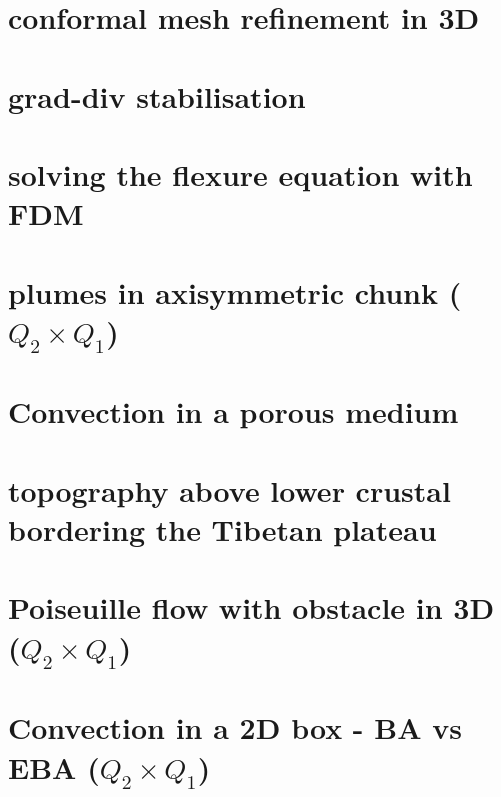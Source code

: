 \documentclass[a4paper,11pt]{report}
\begin{document}
\chapter{conformal mesh refinement in 3D \label{f103}}

\chapter{grad-div stabilisation  \label{f104}}

\chapter{solving the flexure equation with FDM  \label{f105}}

\chapter{plumes in axisymmetric chunk ($Q_2\times Q_1$)  \label{f106}}

\chapter{Convection in a porous medium  \label{f107}}

\chapter{topography above lower crustal bordering the Tibetan plateau \label{f108}}

\chapter{Poiseuille flow with obstacle in 3D ($Q_2\times Q_1$) \label{f109}}

\chapter{Convection in a 2D box - BA vs EBA ($Q_2\times Q_1$) \label{f110}}
\end{document}
